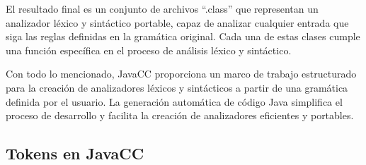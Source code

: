 El resultado final es un conjunto de archivos ``.class'' que representan un analizador léxico y sintáctico portable, capaz de analizar cualquier entrada que siga las reglas definidas en la gramática original. %
Cada una de estas clases cumple una función específica en el proceso de análisis léxico y sintáctico.

Con todo lo mencionado, JavaCC proporciona un marco de trabajo estructurado para la creación de analizadores léxicos y sintácticos a partir de una gramática definida por el usuario. La generación automática de código Java simplifica el proceso de desarrollo y facilita la creación de analizadores eficientes y portables.

\subsection{Tokens en JavaCC}
\label{sec:tokensenjavacc}








